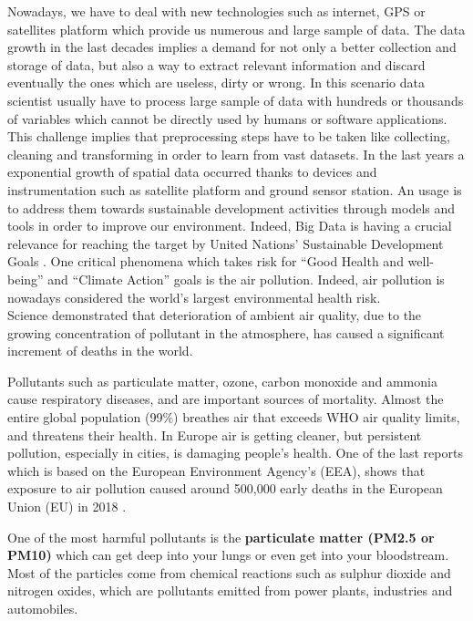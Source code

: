 Nowadays, we have to deal with new technologies such as internet, GPS or satellites platform which provide us numerous and large sample of data. The data growth in the last decades implies a demand for not only a better collection and storage of data, but also a way to extract relevant information and discard eventually the ones which are useless, dirty or wrong.
In this scenario data scientist usually have to process large sample of data with hundreds or thousands of variables which \cite{garcia2016big} cannot be directly used by humans or software applications.
This challenge implies that preprocessing steps have to be taken like collecting, cleaning and transforming  in order to learn from vast datasets.
In the last years a exponential growth of spatial data occurred thanks to devices and instrumentation such as satellite platform and ground sensor station. 
An usage is to address them towards sustainable development activities through models and tools in order to improve our environment. Indeed, Big Data is having a crucial relevance for reaching the target by United Nations’ Sustainable Development Goals \cite{zhang2019orchestrating}.
One critical phenomena which takes risk for “Good Health and well-being” and “Climate Action” goals is the air pollution.
Indeed, air pollution is nowadays considered the world's largest environmental health risk.\\
Science demonstrated that deterioration of ambient air quality, due to the growing concentration of pollutant in the atmosphere, has caused a significant increment of deaths in the world.\par  
Pollutants such as particulate matter, ozone, carbon monoxide and ammonia cause respiratory diseases, and are important sources of mortality.
Almost the entire global population (99\%) breathes air that exceeds WHO air quality limits, and threatens their health.\newline
In Europe air is getting cleaner, but persistent pollution, especially in cities, is damaging people’s health. One of the last reports which is based on the European Environment Agency’s (EEA), shows that exposure to air pollution caused around 500,000 early deaths in the European Union (EU) in 2018 \cite{european2018air}.\par
One of the most harmful pollutants is the \textbf{particulate matter (PM2.5 or PM10)} which can get deep into your lungs or even get into your bloodstream.\newline
Most of the particles come from chemical reactions such as sulphur dioxide and nitrogen oxides, which are pollutants emitted from power plants, industries and automobiles.\par
